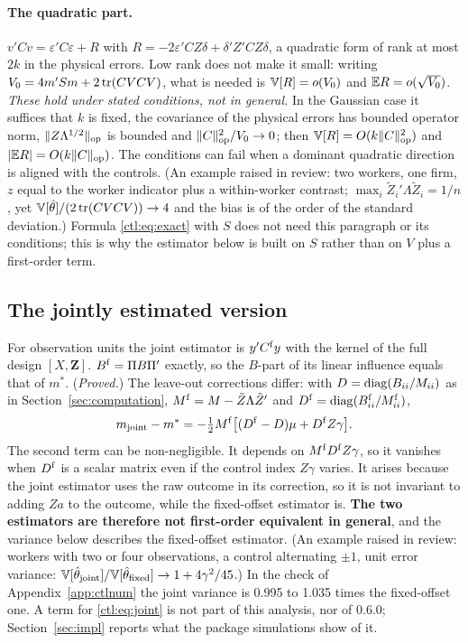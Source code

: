 \paragraph{The quadratic part.} $v'Cv=\varepsilon'C\varepsilon+R$ with $R=-2\varepsilon'CZ\delta+\delta'Z'CZ\delta$,
a quadratic form of rank at most $2k$ in the physical errors. Low rank does not make it small: writing
$V_0=4m'Sm+2\operatorname{tr}(CVCV)$, what is needed is $\mathbb{V}[R]=o(V_0)$ and $\mathbb{E} R=o(\sqrt{V_0})$. \emph{These hold under
stated conditions, not in general.} In the Gaussian case it suffices that $k$ is fixed, the covariance of the
physical errors has bounded operator norm, $\|Z\Lambda^{1/2}\|_{\mathrm{op}}$ is bounded and $\|C\|_{\mathrm{op}}^2/V_0\to0$; then
$\mathbb{V}[R]=O(k\|C\|_{\mathrm{op}}^2)$ and $|\mathbb{E} R|=O(k\|C\|_{\mathrm{op}})$. The conditions can fail when a dominant quadratic direction is
aligned with the controls. (An example raised in review: two workers, one firm, $z$ equal to the worker indicator
plus a within-worker contrast; $\max_i\tilde Z_i'\Lambda\tilde Z_i=1/n$, yet $\mathbb{V}[\hat\theta]/(2\operatorname{tr}(CVCV))\to4$
and the bias is of the order of the standard deviation.) Formula \eqref{ctl:eq:exact} with $S$ does not need this
paragraph or its conditions; this is why the estimator below is built on $S$ rather than on $V$ plus a
first-order term.

\subsection{The jointly estimated version}\label{ctl:joint}

For observation units the joint estimator is $y'C^{\rm f}y$ with the kernel of the full design $[X,\mathbf Z]$.
$B^{\rm f}=\Pi B\Pi'$ exactly, so the $B$-part of its linear influence equals that of $m^*$. (\emph{Proved.}) The
leave-out corrections differ: with $D=\operatorname{diag}(B_{ii}/M_{ii})$ as in Section~\ref{sec:computation},
$M^{\rm f}=M-\tilde Z\Lambda\tilde Z'$ and $D^{\rm f}=\operatorname{diag}(B^{\rm f}_{ii}/M^{\rm f}_{ii})$,
\begin{equation}\label{ctl:eq:joint}
 m_{\rm joint}-m^*=-\tfrac12M^{\rm f}\bigl[(D^{\rm f}-D)\mu+D^{\rm f}Z\gamma\bigr].
\end{equation}
The second term can be non-negligible. It depends on $M^{\rm f}D^{\rm f}Z\gamma$, so it vanishes when $D^{\rm f}$ is
a scalar matrix even if the control index $Z\gamma$ varies. It arises because the joint estimator uses the raw
outcome in its correction, so it is not invariant to adding $Za$ to the outcome, while the fixed-offset estimator
is. \textbf{The two estimators are therefore not first-order equivalent in general}, and the variance below
describes the fixed-offset estimator. (An example raised in review: workers with two or four observations, a
control alternating $\pm1$, unit error variance: $\mathbb{V}[\hat\theta_{\rm joint}]/\mathbb{V}[\hat\theta_{\rm fixed}]\to1+4\gamma^2/45$.)
In the check of Appendix~\ref{app:ctlnum} the joint variance is 0.995 to 1.035 times the fixed-offset one. A term
for \eqref{ctl:eq:joint} is not part of this analysis, nor of \fevc{} 0.6.0; Section~\ref{sec:impl} reports what
the package simulations show of it.

